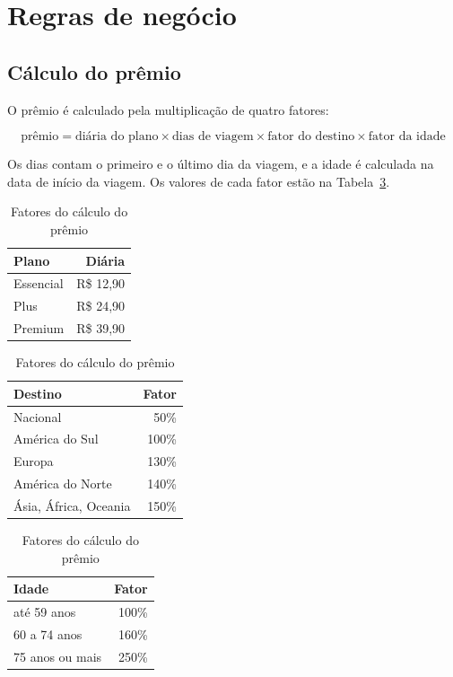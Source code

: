 \documentclass[12pt,a4paper]{article}
\newcommand{\fonte}[1]{\par\vspace{2pt}{\centering\small Fonte: #1\par}}
\begin{document}
\section{Regras de negócio}\label{sec:regras}

\subsection{Cálculo do prêmio}

O prêmio é calculado pela multiplicação de quatro fatores:

\begin{equation*}
  \text{prêmio} = \text{diária do plano} \times \text{dias de viagem}
  \times \text{fator do destino} \times \text{fator da idade}
\end{equation*}

Os dias contam o primeiro e o último dia da viagem, e a idade é calculada na data de início da
viagem. Os valores de cada fator estão na Tabela~\ref{tab:fatores}.

\begin{table}[H]
\centering
\caption{Fatores do cálculo do prêmio}\label{tab:fatores}
\begin{tabular}{@{}lr@{}}
\toprule
Plano & Diária \\
\midrule
Essencial & R\$ 12,90 \\
Plus & R\$ 24,90 \\
Premium & R\$ 39,90 \\
\bottomrule
\end{tabular}
\qquad
\begin{tabular}{@{}lr@{}}
\toprule
Destino & Fator \\
\midrule
Nacional & 50\% \\
América do Sul & 100\% \\
Europa & 130\% \\
América do Norte & 140\% \\
Ásia, África, Oceania & 150\% \\
\bottomrule
\end{tabular}
\qquad
\begin{tabular}{@{}lr@{}}
\toprule
Idade & Fator \\
\midrule
até 59 anos & 100\% \\
60 a 74 anos & 160\% \\
75 anos ou mais & 250\% \\
\bottomrule
\end{tabular}
\fonte{elaborado pelo autor (2026).}
\end{table}
\end{document}
